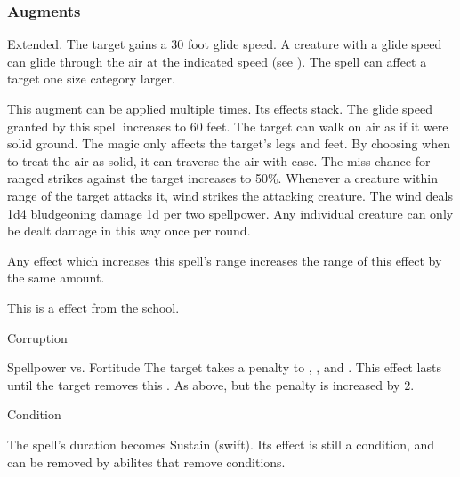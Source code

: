 \subsubsection{Augments}
 Extended.
The target gains a 30 foot glide speed.
A creature with a glide speed can glide through the air at the indicated speed (see ).
The spell can affect a target one size category larger.
\par
This augment can be applied multiple times.
Its effects stack.
The glide speed granted by this spell increases to 60 feet.
The target can walk on air as if it were solid ground.
The magic only affects the target's legs and feet.
By choosing when to treat the air as solid, it can traverse the air with ease.
The miss chance for ranged strikes against the target increases to 50\%.
Whenever a creature within \rngclose range of the target attacks it, wind strikes the attacking creature.
The wind deals 1d4 bludgeoning damage \add 1d per two spellpower.
Any individual creature can only be dealt damage in this way once per round.
\par Any effect which increases this spell's range increases the range of this effect by the same amount.
\par
This is a  effect from the  school.
\begin{spellsection}{Corruption}
\begin{spellheader}
\end{spellheader}
\begin{spellcontent}
\begin{spelltargetinginfo}
\end{spelltargetinginfo}
\begin{spelleffects}
\begin{spellattack}{Spellpower vs. Fortitude}
\spellsuccess
The target takes a  penalty to , , and .
This effect lasts until the target removes this .
\spellcritical
As above, but the penalty is increased by 2.
\end{spellattack}
\spelldur Condition
\end{spelleffects}
\end{spellcontent}
\begin{spellfooter}
\miscastexplode
\end{spellfooter}
\begin{spellcantrip}
The spell's duration becomes Sustain (swift).
Its effect is still a condition, and can be removed by abilites that remove conditions.
\end{spellcantrip}
\end{spellsection}
